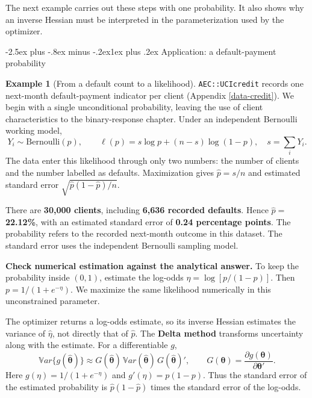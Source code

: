 \documentclass[
  11pt,
]{book}
\makeatletter
\renewcommand\subsection{\@startsection{subsection}{2}{\z@}
  {-2.5ex plus -.8ex minus -.2ex}{1ex plus .2ex}
  {\normalfont\large\bfseries\color{TextbookInk}}}
\theoremstyle{definition}
\theoremstyle{definition}
\newtheorem{example}{Example}[chapter]
\theoremstyle{definition}
\theoremstyle{definition}
\theoremstyle{remark}
\makeatother
\begin{document}
The next example carries out these steps with one probability. It also shows why an inverse Hessian must be interpreted in the parameterization used by the optimizer.


\subsection{Application: a default-payment probability}\label{application-a-default-payment-probability}

\begin{example}[From a default count to a likelihood]
\protect\hypertarget{exm:estimation-credit-mle}{}\label{exm:estimation-credit-mle}\texttt{AEC::UCIcredit} records one next-month default-payment indicator per client (Appendix \ref{data-credit}). We begin with a single unconditional probability, leaving the use of client characteristics to the binary-response chapter. Under an independent Bernoulli working model,
\[
Y_i\sim\mathrm{Bernoulli}(p),\qquad
\ell(p)=s\log p+(n-s)\log(1-p),\quad s=\sum_iY_i.
\]
The data enter this likelihood through only two numbers: the number of clients and the number labelled as defaults. Maximization gives \(\widehat p=s/n\) and estimated standard error \(\sqrt{\widehat p(1-\widehat p)/n}\).

There are \textbf{30,000 clients}, including \textbf{6,636 recorded defaults}. Hence \(\widehat p=\) \textbf{22.12\%}, with an estimated standard error of \textbf{0.24 percentage points}. The probability refers to the recorded next-month outcome in this dataset. The standard error uses the independent Bernoulli sampling model.

\textbf{Check numerical estimation against the analytical answer.} To keep the probability inside \((0,1)\), estimate the log-odds \(\eta=\log[p/(1-p)]\). Then \(p=1/(1+e^{-\eta})\). We maximize the same likelihood numerically in this unconstrained parameter.

The optimizer returns a log-odds estimate, so its inverse Hessian estimates the variance of \(\widehat\eta\), not directly that of \(\widehat p\). The \textbf{Delta method} transforms uncertainty along with the estimate. For a differentiable \(g\),
\begin{equation}
\mathbb{V}ar\{g(\widehat{\boldsymbol\theta})\}
\approx G(\widehat{\boldsymbol\theta})\,
\mathbb{V}ar(\widehat{\boldsymbol\theta})\,
G(\widehat{\boldsymbol\theta})',\qquad
G(\boldsymbol\theta)=\frac{\partial g(\boldsymbol\theta)}{\partial\boldsymbol\theta'}.
\label{eq:DeltaMethod}
\end{equation}
Here \(g(\eta)=1/(1+e^{-\eta})\) and \(g'(\eta)=p(1-p)\). Thus the standard error of the estimated probability is \(\widehat p(1-\widehat p)\) times the standard error of the log-odds.


\end{example}
\end{document}
